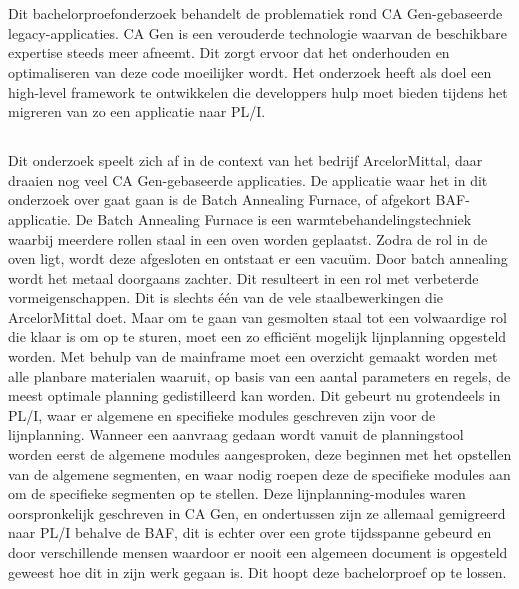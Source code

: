 
\chapter{}%
\label{ch:inleiding}

Dit bachelorproefonderzoek behandelt de problematiek rond CA Gen-gebaseerde legacy-applicaties. CA Gen is een 
verouderde technologie waarvan de beschikbare expertise steeds meer afneemt. Dit zorgt ervoor dat het onderhouden en 
optimaliseren van deze code moeilijker wordt. Het onderzoek heeft als doel een high-level framework te 
ontwikkelen die developpers hulp moet bieden tijdens het migreren van zo een applicatie naar PL/I.

\section{}%
\label{sec:probleemstelling}

Dit onderzoek speelt zich af in de context van het bedrijf ArcelorMittal, daar draaien nog veel CA Gen-gebaseerde 
applicaties. De applicatie waar het in dit onderzoek over gaat gaan is de Batch Annealing Furnace, of 
afgekort BAF-applicatie. De Batch Annealing Furnace is een warmtebehandelingstechniek waarbij meerdere rollen staal in 
een oven worden geplaatst. Zodra de rol in de oven ligt, wordt deze afgesloten en ontstaat er een vacuüm. 
Door batch annealing wordt het metaal doorgaans zachter. Dit resulteert in een rol met verbeterde 
vormeigenschappen. Dit is slechts één van de vele staalbewerkingen die ArcelorMittal doet. Maar om te gaan 
van gesmolten staal tot een volwaardige rol die klaar is om op te sturen, moet een zo efficiënt mogelijk 
lijnplanning opgesteld worden. Met behulp van de mainframe moet een overzicht gemaakt worden met alle planbare 
materialen waaruit, op basis van een aantal parameters en regels, de meest optimale planning gedistilleerd kan 
worden. Dit gebeurt nu grotendeels in PL/I, waar er algemene en specifieke modules geschreven zijn voor de 
lijnplanning. Wanneer een aanvraag gedaan wordt vanuit de planningstool worden eerst de algemene modules 
aangesproken, deze beginnen met het opstellen van de algemene segmenten, en waar nodig roepen deze de 
specifieke modules aan om de specifieke segmenten op te stellen. Deze lijnplanning-modules waren 
oorspronkelijk geschreven in CA Gen, en ondertussen zijn ze allemaal gemigreerd naar PL/I behalve de BAF, dit 
is echter over een grote tijdsspanne gebeurd en door verschillende mensen waardoor er nooit een algemeen 
document is opgesteld geweest hoe dit in zijn werk gegaan is. Dit hoopt deze bachelorproef op te lossen.

